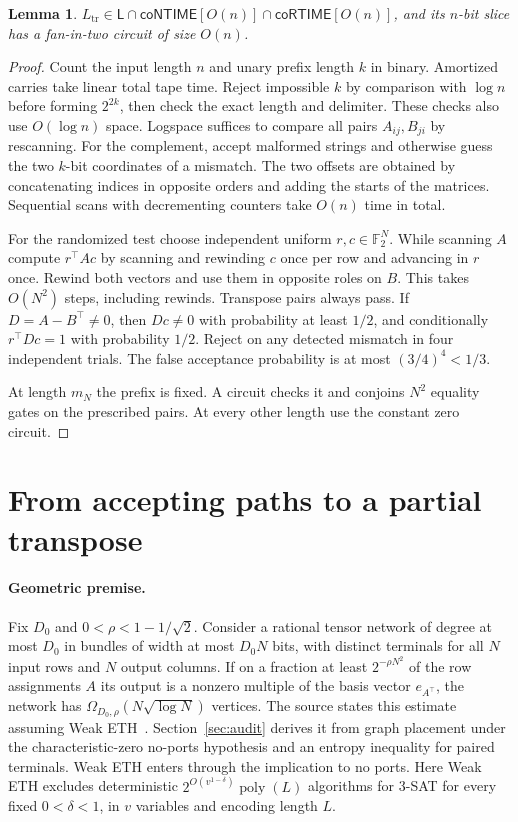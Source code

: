 \documentclass[11pt]{article}
\newtheorem{lemma}[theorem]{Lemma}
\newcommand{\TrLang}{L_{\mathrm{tr}}}
\newcommand{\coNT}{\mathsf{coNTIME}}
\newcommand{\coRT}{\mathsf{coRTIME}}
\begin{document}
\begin{lemma}\label{lem:upper}
$\TrLang\in\mathsf L\cap\coNT[O(n)]\cap\coRT[O(n)]$, and its
$n$-bit slice has a fan-in-two circuit of size $O(n)$.
\end{lemma}
\begin{proof}
Count the input length $n$ and unary prefix length $k$ in binary.
Amortized carries take linear total tape time. Reject impossible $k$
by comparison with $\log n$ before forming $2^{2k}$, then check the
exact length and delimiter. These checks also use $O(\log n)$ space.
Logspace suffices to compare all pairs $A_{ij},B_{ji}$ by rescanning.
For the complement, accept malformed strings and otherwise guess the
two $k$-bit coordinates of a mismatch. The two offsets are obtained
by concatenating indices in opposite orders and adding the starts of
the matrices. Sequential scans with decrementing counters take $O(n)$
time in total.

For the randomized test choose independent uniform $r,c\in\mathbb F_2^N$.
While scanning $A$ compute $r^\top Ac$ by scanning and rewinding $c$ once
per row and advancing in $r$ once. Rewind both vectors and use them in
opposite roles on $B$. This takes $O(N^2)$ steps, including rewinds.
Transpose pairs always pass. If $D=A-B^\top\ne0$, then $Dc\ne0$ with
probability at least $1/2$, and conditionally $r^\top Dc=1$ with
probability $1/2$. Reject on any detected mismatch in four independent
trials. The false acceptance probability is at most $(3/4)^4<1/3$.

At length $m_N$ the prefix is fixed. A circuit checks it and conjoins
$N^2$ equality gates on the prescribed pairs. At every other length
use the constant zero circuit.
\end{proof}

\section{From accepting paths to a partial transpose}
\paragraph{Geometric premise.}
Fix $D_0$ and $0<\rho<1-1/\sqrt2$. Consider a rational tensor network
of degree at most $D_0$ in bundles of width at most $D_0N$ bits, with
distinct terminals for all $N$ input rows and $N$ output columns. If
on a fraction at least $2^{-\rho N^2}$ of the row assignments $A$ its
output is a nonzero multiple of the basis vector $e_{A^\top}$, the
network has $\Omega_{D_0,\rho}(N\sqrt{\log N})$ vertices. The source
states this estimate assuming Weak ETH~\cite{partial}.
Section~\ref{sec:audit} derives it from graph placement under the
characteristic-zero no-ports hypothesis and an entropy inequality for
paired terminals. Weak ETH enters through the implication to no ports.
Here Weak ETH excludes deterministic $2^{O(v^{1-\delta})}
\operatorname{poly}(L)$ algorithms for 3-SAT for every fixed
$0<\delta<1$, in $v$ variables and encoding length $L$.
\end{document}
